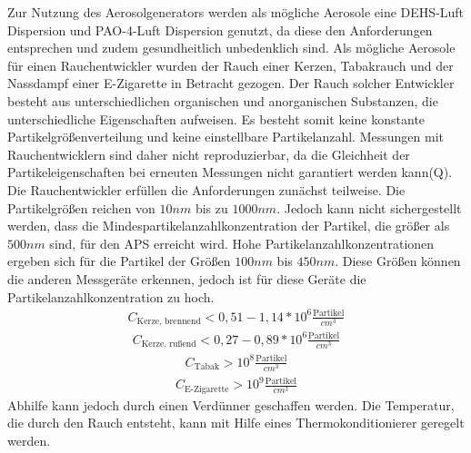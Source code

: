 Zur Nutzung des Aerosolgenerators werden als m\"{o}gliche Aerosole eine DEHS-Luft Dispersion und PAO-4-Luft Dispersion genutzt, da diese den Anforderungen entsprechen und zudem gesundheitlich unbedenklich sind. Als m\"{o}gliche Aerosole f\"{u}r einen Rauchentwickler wurden der Rauch einer Kerzen, Tabakrauch und der Nassdampf einer E-Zigarette in Betracht gezogen. Der Rauch solcher Entwickler besteht aus unterschiedlichen organischen und anorganischen Substanzen, die unterschiedliche Eigenschaften aufweisen. Es besteht somit keine konstante Partikelgr\"{o}{\ss}enverteilung und keine einstellbare Partikelanzahl. Messungen mit Rauchentwicklern sind daher nicht reproduzierbar, da die Gleichheit der Partikeleigenschaften bei erneuten Messungen nicht garantiert werden kann(Q). Die Rauchentwickler erf\"{u}llen die Anforderungen zun\"{a}chst teilweise. Die Partikelgr\"{o}{\ss}en reichen von \(10 nm\) bis zu \(1000 nm\). Jedoch kann nicht sichergestellt werden, dass die Mindespartikelanzahlkonzentration der Partikel, die gr\"{o}{\ss}er als \(500 nm\) sind, f\"{u}r den APS erreicht wird. Hohe Partikelanzahlkonzentrationen ergeben sich f\"{u}r die Partikel der Gr\"{o}{\ss}en \(100 nm\) bis \(450 nm\). Diese Gr\"{o}{\ss}en k\"{o}nnen die anderen Messger\"{a}te erkennen, jedoch ist f\"{u}r diese Ger\"{a}te die Partikelanzahlkonzentration zu hoch.
\begin{align*}
C_\text{Kerze, brennend} < 0,51 - 1,14 * 10^6 \frac{\text{Partikel}}{cm^3}
\end{align*}
\begin{align*}
C_\text{Kerze, ru{\ss}end} < 0,27 - 0,89 * 10^6 \frac{\text{Partikel}}{cm^3}
\end{align*}
\begin{align*}
C_\text{Tabak} > 10^8 \frac{\text{Partikel}}{cm^3}
\end{align*}
\begin{align*}
C_\text{E-Zigarette} > 10^9 \frac{\text{Partikel}}{cm^3}
\end{align*}
Abhilfe kann jedoch durch einen Verd\"{u}nner geschaffen werden. Die Temperatur, die durch den Rauch entsteht, kann mit Hilfe eines Thermokonditionierer geregelt werden.
\\\\

